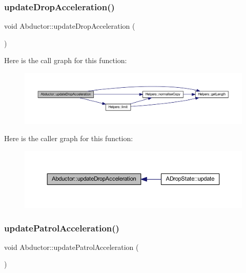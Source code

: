 \subsubsection{\texorpdfstring{update\+Drop\+Acceleration()}{updateDropAcceleration()}}
{\footnotesize\ttfamily void Abductor\+::update\+Drop\+Acceleration (\begin{DoxyParamCaption}{ }\end{DoxyParamCaption})}

Here is the call graph for this function\+:
\nopagebreak
\begin{figure}[H]
\begin{center}
\leavevmode
\includegraphics[width=350pt]{class_abductor_aab823ab3fd94214f90b003661e036d03_cgraph}
\end{center}
\end{figure}
Here is the caller graph for this function\+:
\nopagebreak
\begin{figure}[H]
\begin{center}
\leavevmode
\includegraphics[width=350pt]{class_abductor_aab823ab3fd94214f90b003661e036d03_icgraph}
\end{center}
\end{figure}
\mbox{\label{class_abductor_a24cc63afd005eef7d1ed694933a2c2a0}} 
\subsubsection{\texorpdfstring{update\+Patrol\+Acceleration()}{updatePatrolAcceleration()}}
{\footnotesize\ttfamily void Abductor\+::update\+Patrol\+Acceleration (\begin{DoxyParamCaption}{ }\end{DoxyParamCaption})}


